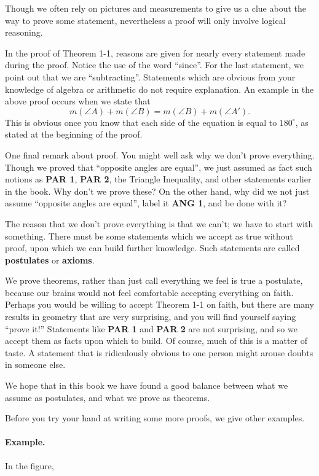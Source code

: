 \documentclass[12pt]{book} %
\begin{document}
Though we often rely on pictures and measurements to give us a clue about the way to prove some statement, nevertheless a proof will only involve logical reasoning.

In the proof of Theorem 1-1, reasons are given for nearly every statement made during the proof. Notice the use of the word ``since''. For the last statement, we point out that we are ``subtracting''. Statements which are obvious from your knowledge of algebra or arithmetic do not require explanation. An example in the above proof occurs when we state that
\[
m(\angle A)+m(\angle B)=m(\angle B)+m(\angle A').
\]
This is obvious once you know that each side of the equation is equal to $180^\circ$, as stated at the beginning of the proof.

One final remark about proof. You might well ask why we don't prove everything. Though we proved that ``opposite angles are equal'', we just assumed as fact such notions as \textbf{PAR 1}, \textbf{PAR 2}, the Triangle Inequality, and other statements earlier in the book. Why don't we prove these? On the other hand, why did we not just assume ``opposite angles are equal'', label it \textbf{ANG 1}, and be done with it?

The reason that we don't prove everything is that we can't; we have to start with something. There must be some statements which we accept as true without proof, upon which we can build further knowledge. Such statements are called \textbf{postulates} or \textbf{axioms}.

We prove theorems, rather than just call everything we feel is true a postulate, because our brains would not feel comfortable accepting everything on faith. Perhaps you would be willing to accept Theorem 1-1 on faith, but there are many results in geometry that are very surprising, and you will find yourself saying ``prove it!'' Statements like \textbf{PAR 1} and \textbf{PAR 2} are not surprising, and so we accept them as facts upon which to build. Of course, much of this is a matter of taste. A statement that is ridiculously obvious to one person might arouse doubts in someone else.

We hope that in this book we have found a good balance between what we assume as postulates, and what we prove as theorems.

Before you try your hand at writing some more proofs, we give other examples.

\paragraph{Example.}
In the figure,
\end{document}
